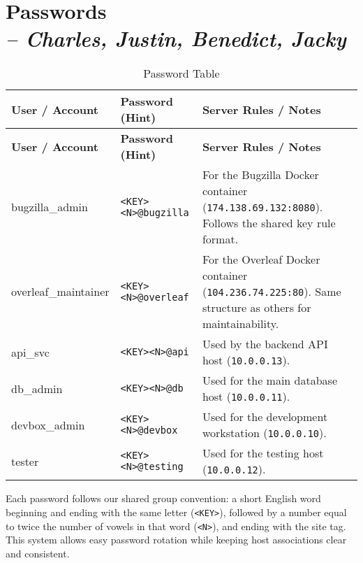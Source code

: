 \chapter[Passwords]{Passwords\\\small{\textit{-- Charles, Justin, Benedict, Jacky}}}
\label{Chapter::Passwords}

\begin{longtable}{|p{2.8cm}||p{4.5cm}||p{8cm}|}
\caption{Password Table \label{Table::PasswordTable}}\\
\hline
\textbf{User / Account} & \textbf{Password (Hint)} & \textbf{Server Rules / Notes} \\
\hline
\endfirsthead
\hline
\textbf{User / Account} & \textbf{Password (Hint)} & \textbf{Server Rules / Notes} \\
\hline
\endhead

bugzilla\_admin & \texttt{<KEY><N>@bugzilla} & For the Bugzilla Docker container (\texttt{174.138.69.132:8080}). Follows the shared key rule format. \\
\hline

overleaf\_maintainer & \texttt{<KEY><N>@overleaf} & For the Overleaf Docker container (\texttt{104.236.74.225:80}). Same structure as others for maintainability. \\
\hline

api\_svc & \texttt{<KEY><N>@api} & Used by the backend API host (\texttt{10.0.0.13}). \\
\hline

db\_admin & \texttt{<KEY><N>@db} & Used for the main database host (\texttt{10.0.0.11}). \\
\hline

devbox\_admin & \texttt{<KEY><N>@devbox} & Used for the development workstation (\texttt{10.0.0.10}). \\
\hline

tester & \texttt{<KEY><N>@testing} & Used for the testing host (\texttt{10.0.0.12}). \\
\hline

\end{longtable}

\noindent
Each password follows our shared group convention: a short English word beginning and ending with the same letter (\texttt{<KEY>}), followed by a number equal to twice the number of vowels in that word (\texttt{<N>}), and ending with the site tag. This system allows easy password rotation while keeping host associations clear and consistent.
